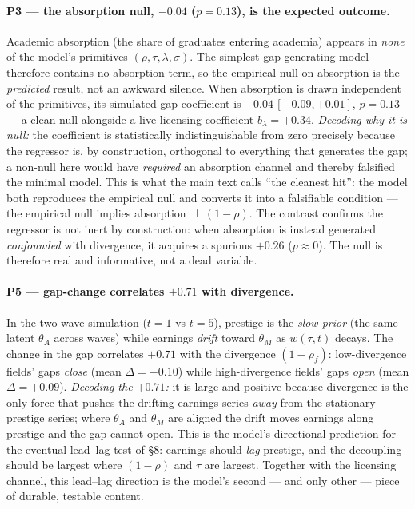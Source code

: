 \documentclass[11pt]{article}
\begin{document}
\paragraph{P3 --- the absorption null, $-0.04$ ($p=0.13$), is the expected outcome.} Academic absorption (the share of graduates entering academia) appears in \emph{none} of the model's primitives $(\rho,\tau,\lambda,\sigma)$. The simplest gap-generating model therefore contains no absorption term, so the empirical null on absorption is the \emph{predicted} result, not an awkward silence. When absorption is drawn independent of the primitives, its simulated gap coefficient is $-0.04\,[-0.09,+0.01]$, $p=0.13$ --- a clean null alongside a live licensing coefficient $b_\lambda=+0.34$. \emph{Decoding why it is null:} the coefficient is statistically indistinguishable from zero precisely because the regressor is, by construction, orthogonal to everything that generates the gap; a non-null here would have \emph{required} an absorption channel and thereby falsified the minimal model. This is what the main text calls ``the cleanest hit'': the model both reproduces the empirical null and converts it into a falsifiable condition --- the empirical null implies absorption $\perp (1-\rho)$. The contrast confirms the regressor is not inert by construction: when absorption is instead generated \emph{confounded} with divergence, it acquires a spurious $+0.26$ ($p\approx 0$). The null is therefore real and informative, not a dead variable.

\paragraph{P5 --- gap-change correlates $+0.71$ with divergence.} In the two-wave simulation ($t{=}1$ vs $t{=}5$), prestige is the \emph{slow prior} (the same latent $\theta_A$ across waves) while earnings \emph{drift} toward $\theta_M$ as $w(\tau,t)$ decays. The change in the gap correlates $+0.71$ with the divergence $(1-\rho_f)$: low-divergence fields' gaps \emph{close} (mean $\Delta=-0.10$) while high-divergence fields' gaps \emph{open} (mean $\Delta=+0.09$). \emph{Decoding the $+0.71$:} it is large and positive because divergence is the only force that pushes the drifting earnings series \emph{away} from the stationary prestige series; where $\theta_A$ and $\theta_M$ are aligned the drift moves earnings along prestige and the gap cannot open. This is the model's directional prediction for the eventual lead--lag test of \S8: earnings should \emph{lag} prestige, and the decoupling should be largest where $(1-\rho)$ and $\tau$ are largest. Together with the licensing channel, this lead--lag direction is the model's second --- and only other --- piece of durable, testable content.
\end{document}
